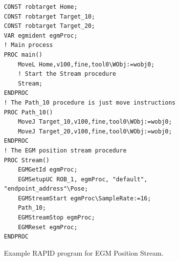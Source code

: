 \documentclass{cslthse-msc}
\begin{document}
\lstset{language=RAPID}
\begin{figure}[H]
    \centering
    \begin{lstlisting}
CONST robtarget Home;
CONST robtarget Target_10;
CONST robtarget Target_20;
VAR egmident egmProc;
! Main process
PROC main()
    MoveL Home,v100,fine,tool0\WObj:=wobj0;
    ! Start the Stream procedure
    Stream;
ENDPROC
! The Path_10 procedure is just move instructions 
PROC Path_10()
    MoveJ Target_10,v100,fine,tool0\WObj:=wobj0;
    MoveJ Target_20,v100,fine,tool0\WObj:=wobj0;
ENDPROC
! The EGM position stream procedure
PROC Stream()
    EGMGetId egmProc;
    EGMSetupUC ROB_1, egmProc, "default", "endpoint_address"\Pose;
    EGMStreamStart egmProc\SampleRate:=16;
    Path_10;
    EGMStreamStop egmProc;
    EGMReset egmProc;
ENDPROC

\end{lstlisting}
\caption{Example RAPID program for EGM Position Stream.}
\label{fig:rapid_pos_stream}
\end{figure}
\end{document}
